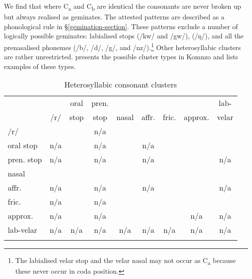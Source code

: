 We find that where C\textsubscript{a} and C\textsubscript{b} are identical the consonants are never broken up but always realised as geminates. The attested  patterns are described as a phonological rule in \S{}\ref{gemination-section}. These patterns exclude a number of logically possible geminates: labialised  stops (/kw/ and /gw/),   (/ŋ/), and all the prenasalised phonemes (/b/, /d/, /g/, and /nz/).\footnote{The labialised velar stop and the velar nasal may not occur as C\textsubscript{a} because these never occur in coda position.} Other heterosyllabic clusters are rather unrestricted.  presents the possible cluster types in Komnzo and  lists examples of these types.

\begin{table}
\caption{Heterosyllabic consonant clusters}
\label{heterosyllcctable}
	\begin{tabularx}{\textwidth}{Xcccccccc}
		\lsptoprule
		&&{oral}&{pren.}&&&&&{lab-}\\
		& /r/ & {stop} & {stop}\footnotemark & {nasal} & {affr.} & {fric.} & {approx.} & {velar}\\ \midrule
		/r/ & \checkmark & \checkmark & n/a & \checkmark & \checkmark & \checkmark & \checkmark  & \checkmark\\%
		{oral stop} & n/a & \checkmark & n/a & \checkmark & n/a & \checkmark & \checkmark  & \checkmark\\%
		{pren. stop} & n/a & \checkmark & n/a & \checkmark & n/a & \checkmark & \checkmark  & n/a\\%
		{nasal} & \checkmark & \checkmark & \checkmark & \checkmark & \checkmark & \checkmark & \checkmark  & \checkmark\\%
		{affr.} & n/a & \checkmark & n/a & \checkmark & n/a & \checkmark & \checkmark & n/a\\%
		{fric.} &  n/a & \checkmark & n/a & \checkmark & \checkmark & \checkmark & \checkmark  & \checkmark\\%
		{approx.} &  n/a & \checkmark & n/a & \checkmark & \checkmark & \checkmark & n/a  & n/a\\%
		{lab-velar} & n/a & n/a& n/a& n/a& n/a& n/a& n/a& n/a\\%
		\lspbottomrule
	\end{tabularx}
\end{table}%


